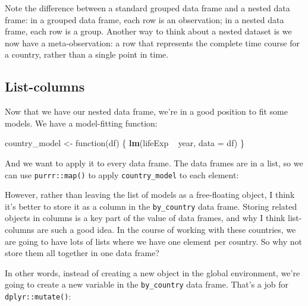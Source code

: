 \documentclass[]{book}
\newenvironment{Shaded}{\begin{snugshade}}{\end{snugshade}}
\newcommand{\KeywordTok}[1]{\textcolor[rgb]{0.13,0.29,0.53}{\textbf{{#1}}}}
\newcommand{\DataTypeTok}[1]{\textcolor[rgb]{0.13,0.29,0.53}{{#1}}}
\newcommand{\StringTok}[1]{\textcolor[rgb]{0.31,0.60,0.02}{{#1}}}
\newcommand{\NormalTok}[1]{{#1}}
\begin{document}
Note the difference between a standard grouped data frame and a nested
data frame: in a grouped data frame, each row is an observation; in a
nested data frame, each row is a group. Another way to think about a
nested dataset is we now have a meta-observation: a row that represents
the complete time course for a country, rather than a single point in
time.

\subsection{List-columns}\label{list-columns}

Now that we have our nested data frame, we're in a good position to fit
some models. We have a model-fitting function:

\begin{Shaded}
\begin{Highlighting}[]
\NormalTok{country_model <-}\StringTok{ }\NormalTok{function(df) \{}
  \KeywordTok{lm}\NormalTok{(lifeExp ~}\StringTok{ }\NormalTok{year, }\DataTypeTok{data =} \NormalTok{df)}
\NormalTok{\}}
\end{Highlighting}
\end{Shaded}

And we want to apply it to every data frame. The data frames are in a
list, so we can use \texttt{purrr::map()} to apply
\texttt{country\_model} to each element:

\begin{Shaded}
\end{Shaded}

However, rather than leaving the list of models as a free-floating
object, I think it's better to store it as a column in the
\texttt{by\_country} data frame. Storing related objects in columns is a
key part of the value of data frames, and why I think list-columns are
such a good idea. In the course of working with these countries, we are
going to have lots of lists where we have one element per country. So
why not store them all together in one data frame?

In other words, instead of creating a new object in the global
environment, we're going to create a new variable in the
\texttt{by\_country} data frame. That's a job for
\texttt{dplyr::mutate()}:
\end{document}
